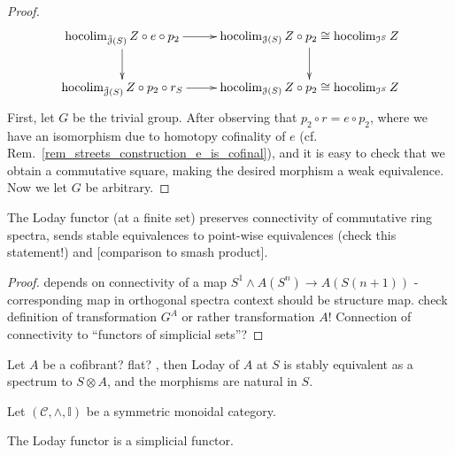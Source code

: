 \begin{lem}
\begin{proof}
        \begin{displaymath}
          \xymatrix{
            \hocolim_{\tilde{\cJ}(S)} Z \circ e \circ p_2
              \ar[r]
              \ar[d]
            &
            \hocolim_{\cJ(S)} Z \circ p_2 \cong \hocolim_{\cI^S} Z
              \ar[d]
            \\
            \hocolim_{\tilde{\cJ}(S)} Z \circ p_2 \circ r_S 
              \ar[r]
            &
            \hocolim_{\cJ(S)} Z \circ p_2 \cong \hocolim_{\cI^S} Z
          }
        \end{displaymath}
        First, let $G$ be the trivial group. After observing that $p_2 \circ r =
        e \circ p_2$, where we have an isomorphism due to homotopy cofinality of
        $e$ (cf.  Rem.~\ref{rem_streets_construction_e_is_cofinal}), and it is
        easy to check that we obtain a commutative square, making the desired
        morphism a weak equivalence.\\
        Now we let $G$ be arbitrary. 
      \end{proof}
    \end{lem}
    \begin{lem}\label{lem_loday_functor_preserves_connectivity}
      The Loday functor (at a finite set) preserves connectivity of commutative ring spectra, sends stable equivalences to point-wise equivalences (check this statement!) and [comparison to smash product].
      \begin{proof}
        depends on connectivity of a map $S^1 \wedge A(S^n) \to A(S(n+1))$ - corresponding map in orthogonal spectra context should be structure map. check definition of transformation $G^A$ or rather transformation $A$! Connection of connectivity to ``functors of simplicial sets''?
      \end{proof}
    \end{lem}
    \begin{cor}\label{cor_loday_at_S_naturally_equivalent_to_tensor_with_S}
      Let $A$ be a cofibrant? flat? \hring, then Loday of $A$ at $S$ is stably equivalent as a spectrum to $S \otimes A$, and the morphisms are natural in $S$.
    \end{cor}
    \begin{defn}\label{def_loday_functor_in_symmetric_monoidal_category} 
      Let $(\mathcal{C},\wedge, \mathbb{I})$ be a symmetric monoidal category.\\
    \end{defn}
    \begin{lem}\label{lem_loday_functor_is_simplicial}
      The Loday functor is a simplicial functor.\\
    \end{lem}
